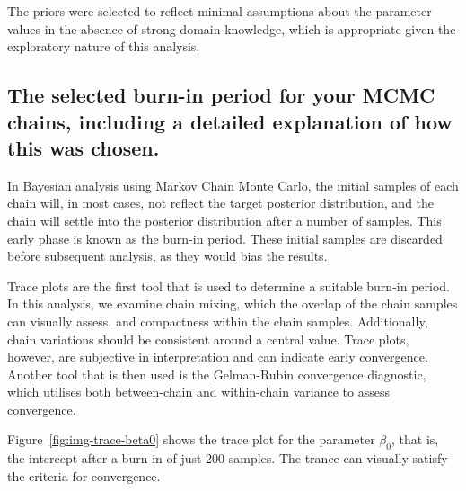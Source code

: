 \documentclass[]{article}
\begin{document}
The priors were selected to reflect minimal assumptions about the parameter values in the absence of strong domain knowledge, which is appropriate given the exploratory nature of this analysis.

\subsection{The selected burn-in period for your MCMC chains, including a detailed explanation
of how this was chosen.}

In Bayesian analysis using Markov Chain Monte Carlo, the initial samples of each chain will, in most cases, not reflect the target posterior distribution, and the chain will settle into the posterior distribution after a number of samples. This early phase is known as the burn-in period. These initial samples are discarded before subsequent analysis, as they would bias the results.

Trace plots are the first tool that is used to determine a suitable burn-in period. In this analysis, we examine chain mixing, which the overlap of the chain samples can visually assess, and compactness within the chain samples. Additionally, chain variations should be consistent around a central value. Trace plots, however, are subjective in interpretation and can indicate early convergence. Another tool that is then used is the Gelman-Rubin convergence diagnostic, which utilises both between-chain and within-chain variance to assess convergence.

Figure~\ref{fig:img-trace-beta0} shows the trace plot for the parameter $\beta_0$, that is, the intercept after a burn-in of just 200 samples. The trance can visually satisfy the criteria for convergence.
\end{document}

